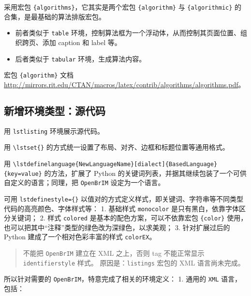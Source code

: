 \documentclass[../Main/thesis.tex]{subfiles}
\begin{document}
采用宏包 \texttt{\{algorithms\}}，它其实是两个宏包
\texttt{\{algorithm\}} 与 \texttt{\{algorithmic\}}
的合集，是最基础的算法排版宏包。

\begin{itemize}
\item
  前者类似于 \texttt{table}
  环境，控制算法框为一个浮动体，从而控制其页面位置、组织跨页、添加
  caption 和 label 等。
\item
  后者类似于 \texttt{tabular} 环境，生成算法内容。
\end{itemize}

宏包 \texttt{\{algorithm\}} 文档
\url{http://mirrors.rit.edu/CTAN/macros/latex/contrib/algorithms/algorithms.pdf}。

\subsection{新增环境类型：源代码}

用 \texttt{lstlisting} 环境展示源代码。

用 \texttt{\textbackslash{}lstset\{\}}
的方式统一设置了布局、对齐、边框和标题位置等通用格式。

用
\texttt{\textbackslash{}lstdefinelanguage\{NewLanguageName\}{[}dialect{]}\{BasedLanguage\}\{key=value\}}
的方法，扩展了 Python
的关键词列表，并据其继续包装了一个可供自定义的语言；同理，把
\texttt{OpenBrIM} 设定为一个语言。

可用 \texttt{lstdefinestyle=\{\}}
以值对的方式定义样式，即关键词、字符串等不同类型代码的高亮颜色、字体样式等：
1. 基础样式 \texttt{monocolor} 是只有黑白，依靠字体区分关键词； 2. 样式
\texttt{colored} 是基本的配色方案，可以不依靠宏包 \texttt{\{color\}}
使用，也可以把其中``注释''类型的绿色改为深绿色，以求美观； 3.
针对扩展过后的 Python 建成了一个相对色彩丰富的样式 \texttt{colorEX}。

\begin{quote}
不能把 \texttt{OpenBrIM} 建立在 XML 之上，否则 tag 不能正常显示
\texttt{identifierstyle} 样式。 原因是：\texttt{listings} 宏包的 XML
语言尚未完成。
\end{quote}

所以针对需要的 \texttt{OpenBrIM}，特意完成了相关的环境定义： 1. 通用的
\texttt{XML} 语言，包括：
\end{document}

